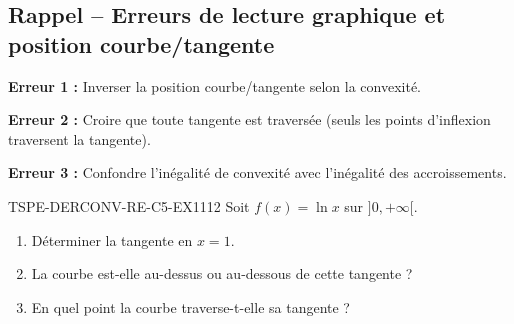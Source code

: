 

\subsection*{Rappel -- Erreurs de lecture graphique et position courbe/tangente}

\textbf{Erreur 1 :} Inverser la position courbe/tangente selon la convexité.

\textbf{Erreur 2 :} Croire que toute tangente est traversée (seuls les points d'inflexion traversent la tangente).

\textbf{Erreur 3 :} Confondre l'inégalité de convexité avec l'inégalité des accroissements.

\begin{exercice}{TSPE-DERCONV-RE-C5-EX1}{1}{12}
Soit $f(x) = \ln x$ sur $]0, +\infty[$.
\begin{enumerate}
  \item Déterminer la tangente en $x = 1$.
  \item La courbe est-elle au-dessus ou au-dessous de cette tangente ?
  \item En quel point la courbe traverse-t-elle sa tangente ?
\end{enumerate}
\end{exercice}

